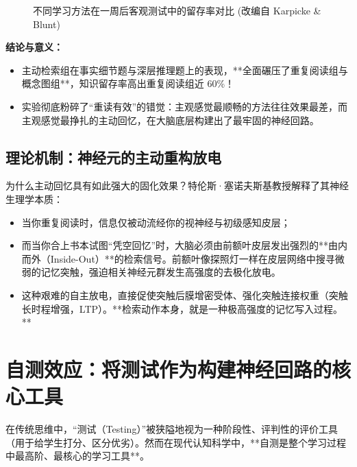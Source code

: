 \documentclass[12pt,a4paper,openany]{ctexbook}
\begin{document}
\begin{casebox}
\begin{figure}[H]
\caption{不同学习方法在一周后客观测试中的留存率对比 (改编自 Karpicke \& Blunt)}
\end{figure}

\textbf{结论与意义：}
\begin{itemize}
    \item 主动检索组在事实细节题与深层推理题上的表现，**全面碾压了重复阅读组与概念图组**，知识留存率高出重复阅读组近 60\%！
    \item 实验彻底粉碎了“重读有效”的错觉：主观感觉最顺畅的方法往往效果最差，而主观感觉最挣扎的主动回忆，在大脑底层构建出了最牢固的神经回路。
\end{itemize}
\end{casebox}

\subsection*{理论机制：神经元的主动重构放电}

为什么主动回忆具有如此强大的固化效果？特伦斯·塞诺夫斯基教授解释了其神经生理学本质：
\begin{itemize}
    \item 当你重复阅读时，信息仅被动流经你的视神经与初级感知皮层；
    \item 而当你合上书本试图“凭空回忆”时，大脑必须由前额叶皮层发出强烈的**由内而外（Inside-Out）**的检索信号。前额叶像探照灯一样在皮层网络中搜寻微弱的记忆突触，强迫相关神经元群发生高强度的去极化放电。
    \item 这种艰难的自主放电，直接促使突触后膜增密受体、强化突触连接权重（突触长时程增强，LTP）。**检索动作本身，就是一种极高强度的记忆写入过程。**
\end{itemize}

\section{自测效应：将测试作为构建神经回路的核心工具}

在传统思维中，“测试（Testing）”被狭隘地视为一种阶段性、评判性的评价工具（用于给学生打分、区分优劣）。然而在现代认知科学中，**自测是整个学习过程中最高阶、最核心的学习工具**。
\end{document}
